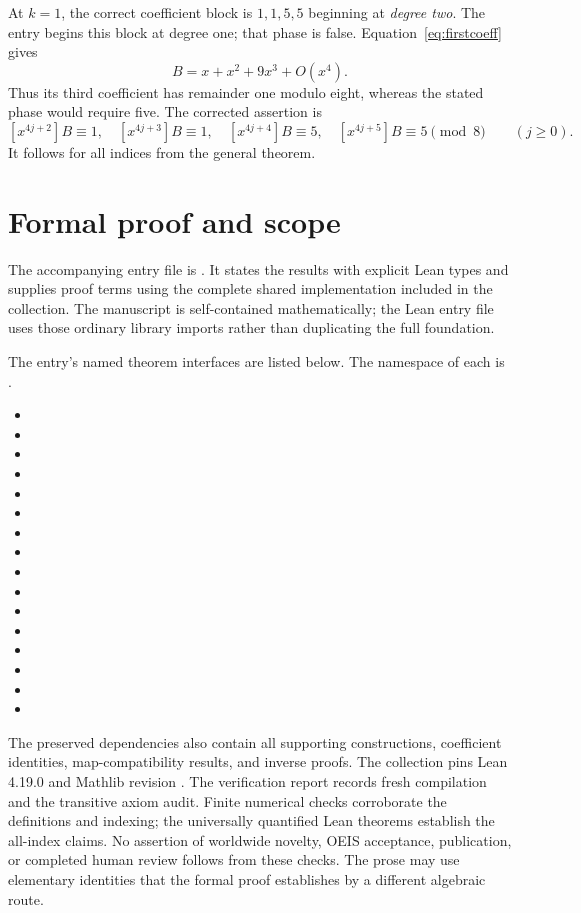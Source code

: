 \documentclass[11pt,a4paper]{article}
\theoremstyle{remark}\newtheorem{remark}[theorem]{Remark}
\newcommand{\coeff}[2]{[x^{#1}]#2}
\begin{document}
At $k=1$, the correct coefficient block is $1,1,5,5$ beginning
at \emph{degree two}. The entry begins this block at degree one;
that phase is false. Equation~\eqref{eq:firstcoeff} gives
\[
B=x+x^2+9x^3+O(x^4).
\]
Thus its third coefficient has remainder one modulo eight, whereas
the stated phase would require five. The corrected assertion is
\[
\coeff{4j+2}{B}\equiv1,\quad
\coeff{4j+3}{B}\equiv1,\quad
\coeff{4j+4}{B}\equiv5,\quad
\coeff{4j+5}{B}\equiv5\pmod8
\qquad(j\ge0).
\]
It follows for all indices from the general theorem.


\section{Formal proof and scope}
The accompanying entry file is .
It states the results with explicit Lean types and supplies proof terms
using the complete shared implementation included in the collection.
The manuscript is self-contained mathematically; the Lean entry file uses
those ordinary library imports rather than duplicating the full foundation.

The entry's named theorem interfaces are listed below. The namespace of
each is .
\begin{itemize}[leftmargin=1.5em,itemsep=1pt]
\item {}
\item {}
\item {}
\item {}
\item {}
\item {}
\item {}
\item {}
\item {}
\item {}
\item {}
\item {}
\item {}
\item {}
\item {}
\item {}
\end{itemize}
The preserved dependencies also contain all supporting constructions,
coefficient identities, map-compatibility results, and inverse proofs.
The collection pins Lean 4.19.0 and Mathlib revision
.
The verification report records fresh compilation and the transitive axiom
audit. Finite numerical checks corroborate the definitions and indexing;
the universally quantified Lean theorems establish the all-index claims.
No assertion of worldwide novelty, OEIS acceptance, publication, or completed
human review follows from these checks. The prose may use elementary
identities that the formal proof establishes by a different algebraic route.
\end{document}
